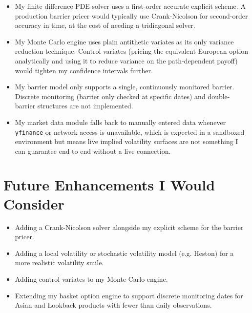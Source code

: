 \documentclass[12pt,a4paper]{article}
\begin{document}
\begin{itemize}[noitemsep]
    \item My finite difference PDE solver uses a first-order accurate explicit scheme. A production barrier pricer would typically use Crank-Nicolson for second-order accuracy in time, at the cost of needing a tridiagonal solver.
    \item My Monte Carlo engine uses plain antithetic variates as its only variance reduction technique. Control variates (pricing the equivalent European option analytically and using it to reduce variance on the path-dependent payoff) would tighten my confidence intervals further.
    \item My barrier model only supports a single, continuously monitored barrier. Discrete monitoring (barrier only checked at specific dates) and double-barrier structures are not implemented.
    \item My market data module falls back to manually entered data whenever \texttt{yfinance} or network access is unavailable, which is expected in a sandboxed environment but means live implied volatility surfaces are not something I can guarantee end to end without a live connection.
\end{itemize}

\section{Future Enhancements I Would Consider}

\begin{itemize}[noitemsep]
    \item Adding a Crank-Nicolson solver alongside my explicit scheme for the barrier pricer.
    \item Adding a local volatility or stochastic volatility model (e.g. Heston) for a more realistic volatility smile.
    \item Adding control variates to my Monte Carlo engine.
    \item Extending my basket option engine to support discrete monitoring dates for Asian and Lookback products with fewer than daily observations.
\end{itemize}
\end{document}
